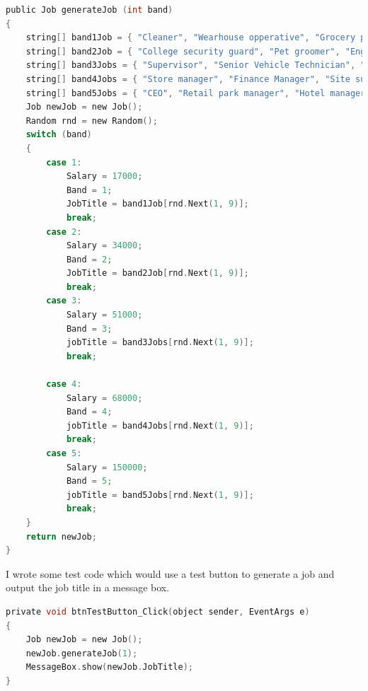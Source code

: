 \begin{lstlisting}[language=c, style=csharp, caption=Algorithm to generate jobs]
 public Job generateJob (int band)
{
    string[] band1Job = { "Cleaner", "Wearhouse opperative", "Grocery picker", "Sahara delivery driver", "Burger flipper", "Hospital porter", "Community care worker", "Care assistant", "Handyperson", "Nursery assistant" };
    string[] band2Job = { "College security guard", "Pet groomer", "Engineer", "Secretary", "Line cook", "Plumber", "Cleaning company owner", "HR advisor", "Vehicle Technician", "Tanker driver" };
    string[] band3Jobs = { "Supervisor", "Senior Vehicle Technician", "Head of Resources", "Product manager", "Web developer", "Comms manager", "Software engineer", "Project manager", "Site manager", "Sales Director" };
    string[] band4Jobs = { "Store manager", "Finance Manager", "Site supervisor", "Nursing home manager", "IT Solutions Architect", "Senior API Developer", "Electrical Installation Lecturer", "Matron", "Defects manager", "Family Lawyer" };
    string[] band5Jobs = { "CEO", "Retail park manager", "Hotel manager", "Specialty doctor", "User interface designer", "SQL Developer", "DevOps engineer", "Senior Software consultant", "Executive head teacher", "Hospital director" };
    Job newJob = new Job();
    Random rnd = new Random();
    switch (band)
    {
        case 1:
            Salary = 17000;
            Band = 1;
            JobTitle = band1Job[rnd.Next(1, 9)];
            break;
        case 2:
            Salary = 34000;
            Band = 2;
            JobTitle = band2Job[rnd.Next(1, 9)];
            break;
        case 3:
            Salary = 51000;
            Band = 3;
            jobTitle = band3Jobs[rnd.Next(1, 9)];
            break;

        case 4:
            Salary = 68000;
            Band = 4;
            jobTitle = band4Jobs[rnd.Next(1, 9)];
            break;
        case 5:
            Salary = 150000;
            Band = 5;
            jobTitle = band5Jobs[rnd.Next(1, 9)];
            break;
    }
    return newJob;
}
\end{lstlisting}
I wrote some test code which would use a test button to generate a job and output the job title in a message box.
\begin{lstlisting}[language=c, style=csharp, caption=Procedure to call the generateJob function]
private void btnTestButton_Click(object sender, EventArgs e)
{
    Job newJob = new Job();
    newJob.generateJob(1);
    MessageBox.show(newJob.JobTitle);
}
\end{lstlisting}
